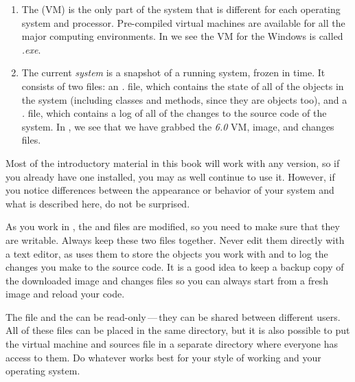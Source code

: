 \documentclass[a4paper,10pt,twoside]{book}
\begin{document}
\begin{enumerate}

  \item The  (VM) is the only part of the system that is different for each operating system and processor.  Pre-compiled virtual machines are available for all the major computing environments.
  In  we see the VM for the Windows is called \textit{\sq.exe}.

  \item The current \emph{system } is a snapshot of a running \sq system, frozen in time.
  It consists of two files: an \emph{.} file, which contains the state of all of the objects in the system (including classes and methods, since they are objects too), and a \emph{.} file, which contains a log of all of the changes to the source code of the system.
In , we see that we have grabbed the \textit{{\sq}6.0} VM, image, and changes files.
\end{enumerate}

\label{sec:sbeImage}

Most of the introductory material in this book will work with any version, so if you already have one installed, you may as well continue to use it.
However, if you notice differences between the appearance or behavior of your system and what is described here, do not be surprised.

As you work in \sq, the  and  files are modified, so you need to make sure that they are writable.
Always keep these two files together.
Never edit them directly with a text editor, as \sq uses them to store the objects you work with and to log the changes you make to the source code.
It is a good idea to keep a backup copy of the downloaded image and changes files so you can always start from a fresh image and reload your code.

The  file and the  can be read-only\,---\,they can be shared between different users.
All of these files can be placed in the same directory, but it is also possible to put the virtual machine and sources file in a separate directory where everyone has access to them.
Do whatever works best for your style of working and your operating system.

\end{document}
